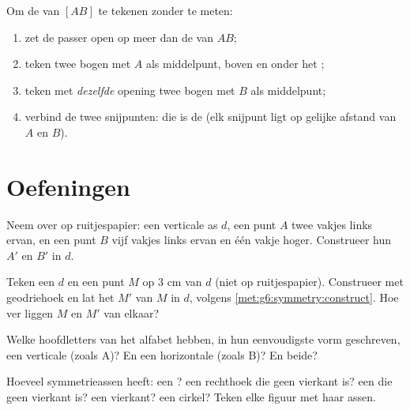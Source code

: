 \begin{method}\label{met:g6:symmetry:bisector}
Om de  van $[AB]$ te tekenen zonder te meten:
\begin{enumerate}
  \item zet de passer open op meer dan de  van $AB$;
  \item teken twee bogen met $A$ als middelpunt, boven en onder het ;
  \item teken met \emph{dezelfde} opening twee bogen met $B$ als middelpunt;
  \item verbind de twee snijpunten: die  is de  (elk snijpunt
        ligt op gelijke afstand van $A$ en $B$).
\end{enumerate}
\end{method}

\section{Oefeningen}

\begin{exercise}[$\star$]\label{exo:g6:symmetry:1}
Neem over op ruitjespapier: een verticale as $d$, een punt $A$ twee vakjes links
ervan, en een punt $B$ vijf vakjes links ervan en één vakje hoger. Construeer
hun  $A'$ en $B'$ in $d$.
\end{exercise}

\begin{exercise}[$\star$]\label{exo:g6:symmetry:2}
Teken een  $d$ en een punt $M$ op $3$ cm van $d$ (niet op ruitjespapier).
Construeer met geodriehoek en lat het  $M'$ van $M$ in $d$, volgens
\cref{met:g6:symmetry:construct}. Hoe ver liggen $M$ en $M'$ van elkaar?
\end{exercise}

\begin{exercise}[$\star$]\label{exo:g6:symmetry:3}
Welke hoofdletters van het alfabet hebben, in hun eenvoudigste vorm geschreven,
een verticale  (zoals A)? En een horizontale (zoals B)? En beide?
\end{exercise}

\begin{exercise}[$\star$]\label{exo:g6:symmetry:4}
Hoeveel symmetrieassen heeft: een ? een rechthoek die geen
vierkant is? een  die geen vierkant is? een vierkant? een cirkel? Teken elke
figuur met haar assen.
\end{exercise}

